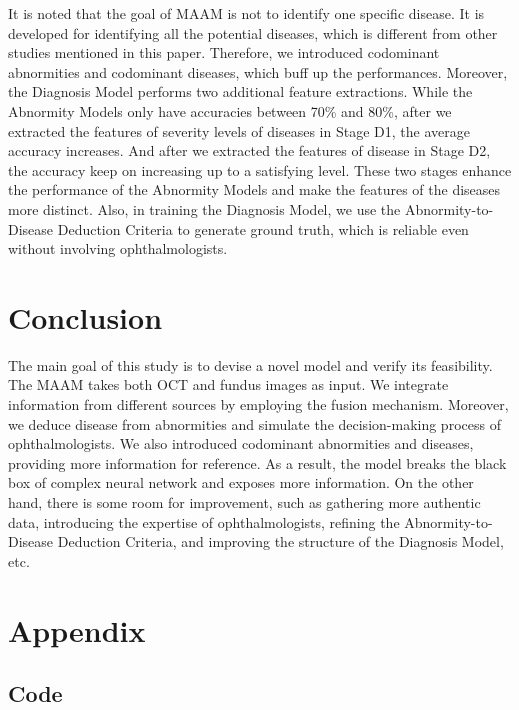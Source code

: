 \documentclass{article}
\begin{document}
\begin{multicols}{2}
	It is noted that the goal of MAAM is not to identify one specific disease.  It is developed for identifying all the potential diseases, which is different from other studies mentioned in this paper.  Therefore, we introduced codominant abnormities and codominant diseases, which buff up the performances. Moreover, the Diagnosis Model performs two additional feature extractions. While the Abnormity Models only have accuracies between 70\% and 80\%, after we extracted the features of severity levels of diseases in Stage D1, the average accuracy increases. And after we extracted the features of disease in Stage D2, the accuracy keep on increasing up to a satisfying level. These two stages enhance the performance of the Abnormity Models and make the features of the diseases more distinct.	Also, in training the Diagnosis Model, we use the Abnormity-to-Disease Deduction Criteria to generate ground truth, which is reliable even without involving ophthalmologists.
	
	\section{Conclusion}
	
	The main goal of this study is to devise a novel model and verify its feasibility. The MAAM takes both OCT and fundus images as input. We integrate information from different sources by employing the fusion mechanism. Moreover, we deduce disease from abnormities and simulate the decision-making process of ophthalmologists. We also introduced codominant abnormities and diseases, providing more information for reference. As a result, the model breaks the black box of complex neural network and exposes more information. On the other hand, there is some room for improvement, such as gathering more authentic data, introducing the expertise of ophthalmologists, refining the Abnormity-to-Disease Deduction Criteria, and improving the structure of the Diagnosis Model, etc.
	
	\newrefcontext[sorting=nyt]
	\printbibliography
	
	\end{multicols}
	
	\pagebreak
	\section*{Appendix}
	
	\subsection*{Code}
	
\end{document}
